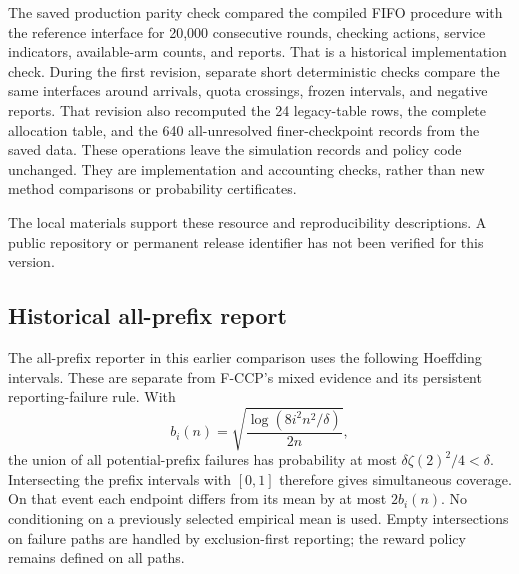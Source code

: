 \documentclass[11pt]{article}
\theoremstyle{remark}
\begin{document}
The saved production parity check compared the compiled FIFO procedure
with the reference interface for 20,000 consecutive rounds, checking
actions, service indicators, available-arm counts, and reports. That is a
historical implementation check. During the first revision, separate short
deterministic checks compare the same interfaces around arrivals, quota
crossings, frozen intervals, and negative reports. That revision also
recomputed the 24 legacy-table rows, the complete allocation table, and the
640 all-unresolved finer-checkpoint records from the saved data.
These operations leave the simulation records and policy code unchanged.
They are implementation and accounting checks, rather than new method
comparisons or probability certificates.

The local materials support these resource and reproducibility
descriptions. A public repository or permanent release identifier has not
been verified for this version.



\subsection{Historical all-prefix report}
\label{app:legacy-prefix}
The all-prefix reporter in this earlier comparison uses the following
Hoeffding intervals. These are separate from F-CCP's mixed evidence and
its persistent reporting-failure rule.
With
\[
 b_i(n)=\sqrt{\frac{\log(8i^2n^2/\delta)}{2n}},
\]
the union of all potential-prefix failures has probability at most
$\delta\zeta(2)^2/4<\delta$. Intersecting the prefix intervals with $[0,1]$
therefore gives simultaneous coverage. On that event each endpoint differs
from its mean by at most $2b_i(n)$. No conditioning on a previously selected
empirical mean is used. Empty intersections on failure paths are handled by
exclusion-first reporting; the reward policy remains defined on all paths.


\FloatBarrier

\FloatBarrier


\end{document}
